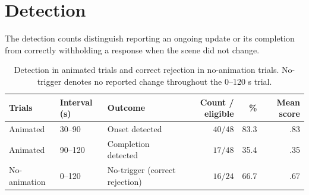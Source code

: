 \documentclass[
english,                 %
bibtex,                  %
includeExtraAbstracts, %
]{kththesis}
\newenvironment{evidenceblock}{\par\addvspace{6pt}\noindent\begin{minipage}{\linewidth}}{\end{minipage}\par\addvspace{6pt}}
\numberwithin{listing}{chapter}
\begin{document}
\section{Detection}
\label{app:rq1-tables}

\begin{evidenceblock}
\normalsize
The detection counts distinguish reporting an ongoing update or its completion from correctly withholding a response when the scene did not change.

\begin{table}[H]
\centering
\scriptsize
\caption[Detection and correct rejection]{Detection in animated trials and correct rejection in no-animation trials. No-trigger denotes no reported change throughout the 0--120 s trial.}
\label{tab:rq1-detection-by-trial-type}
\begin{tabularx}{\textwidth}{@{}l l >{\raggedright\arraybackslash}X r r r@{}}
\toprule
Trials & Interval (s) & Outcome & Count / eligible & \% & Mean score \\
\midrule
Animated & 30--90 & Onset detected & $40/48$ & 83.3 & .83 \\
Animated & 90--120 & Completion detected & $17/48$ & 35.4 & .35 \\

No-animation & 0--120 & No-trigger (correct rejection) & $16/24$ & 66.7 & .67 \\
\bottomrule
\end{tabularx}
\end{table}
\end{evidenceblock}
\end{document}
